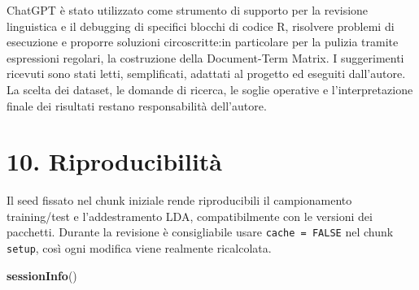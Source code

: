 \documentclass[
]{article}
\newenvironment{Shaded}{\begin{snugshade}}{\end{snugshade}}
\newcommand{\FunctionTok}[1]{\textcolor[rgb]{0.13,0.29,0.53}{\textbf{#1}}}
\newcommand{\NormalTok}[1]{#1}
\begin{document}
ChatGPT è stato utilizzato come strumento di supporto per la revisione
linguistica e il debugging di specifici blocchi di codice R, risolvere
problemi di esecuzione e proporre soluzioni circoscritte:in particolare
per la pulizia tramite espressioni regolari, la costruzione della
Document-Term Matrix. I suggerimenti ricevuti sono stati letti,
semplificati, adattati al progetto ed eseguiti dall'autore. La scelta
dei dataset, le domande di ricerca, le soglie operative e
l'interpretazione finale dei risultati restano responsabilità
dell'autore.

\section{10. Riproducibilità}\label{riproducibilituxe0}

Il seed fissato nel chunk iniziale rende riproducibili il campionamento
training/test e l'addestramento LDA, compatibilmente con le versioni dei
pacchetti. Durante la revisione è consigliabile usare
\texttt{cache\ =\ FALSE} nel chunk \texttt{setup}, così ogni modifica
viene realmente ricalcolata.

\begin{Shaded}
\begin{Highlighting}[]
\FunctionTok{sessionInfo}\NormalTok{()}
\end{Highlighting}
\end{Shaded}
\end{document}
